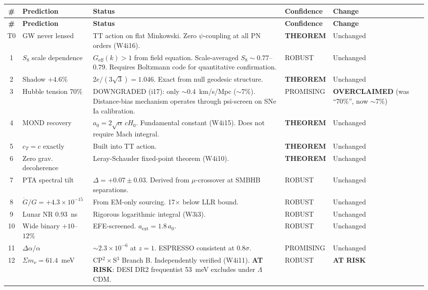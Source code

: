\documentclass[11pt]{article}
\begin{document}
\begin{longtable}{clp{5cm}ll}
\toprule
\textbf{\#} & \textbf{Prediction} & \textbf{Status} & \textbf{Confidence} & \textbf{Change} \\
\midrule
\endfirsthead
\toprule
\textbf{\#} & \textbf{Prediction} & \textbf{Status} & \textbf{Confidence} & \textbf{Change} \\
\midrule
\endhead
T0 & GW never lensed & TT action on flat Minkowski. Zero $\psi$-coupling at all PN orders (W4i16). & \textbf{THEOREM} & Unchanged \\
\midrule
1 & $S_8$ scale dependence & $G_\text{eff}(k) > 1$ from field equation. Scale-averaged $S_8 \sim 0.77$--$0.79$. Requires Boltzmann code for quantitative confirmation. & ROBUST & Unchanged \\
\midrule
2 & Shadow $+4.6\%$ & $2e/(3\sqrt{3}) = 1.046$. Exact from null geodesic structure. & \textbf{THEOREM} & Unchanged \\
\midrule
3 & Hubble tension 70\% & DOWNGRADED (i17): only $\sim$0.4~km/s/Mpc ($\sim$7\%). Distance-bias mechanism operates through psi-screen on SNe Ia calibration. & PROMISING & \textbf{OVERCLAIMED} (was ``70\%'', now $\sim$7\%) \\
\midrule
4 & MOND recovery & $a_0 = 2\sqrt{\alpha}\,cH_0$. Fundamental constant (W4i15). Does not require Mach integral. & \textbf{THEOREM} & Unchanged \\
\midrule
5 & $c_T = c$ exactly & Built into TT action. & \textbf{THEOREM} & Unchanged \\
\midrule
6 & Zero grav. decoherence & Leray-Schauder fixed-point theorem (W4i10). & \textbf{THEOREM} & Unchanged \\
\midrule
7 & PTA spectral tilt & $\Delta = +0.07 \pm 0.03$. Derived from $\mu$-crossover at SMBHB separations. & ROBUST & Unchanged \\
\midrule
8 & $\dot{G}/G = +4.3 \times 10^{-15}$ & From EM-only sourcing. 17$\times$ below LLR bound. & ROBUST & Unchanged \\
\midrule
9 & Lunar NR 0.93~ns & Rigorous logarithmic integral (W3i3). & ROBUST & Unchanged \\
\midrule
10 & Wide binary $+10$--$12\%$ & EFE-screened. $a_\text{ext} = 1.8\,a_0$. & ROBUST & Unchanged \\
\midrule
11 & $\Delta\alpha/\alpha$ & $\sim 2.3 \times 10^{-6}$ at $z=1$. ESPRESSO consistent at 0.8$\sigma$. & PROMISING & Unchanged \\
\midrule
12 & $\Sigma m_\nu = 61.4$~meV & CP$^2 \times$S$^3$ Branch B. Independently verified (W4i11). \textbf{AT RISK}: DESI DR2 frequentist 53~meV excludes under $\Lambda$CDM. & ROBUST & \textbf{AT RISK} \\

\end{longtable}
\end{document}
